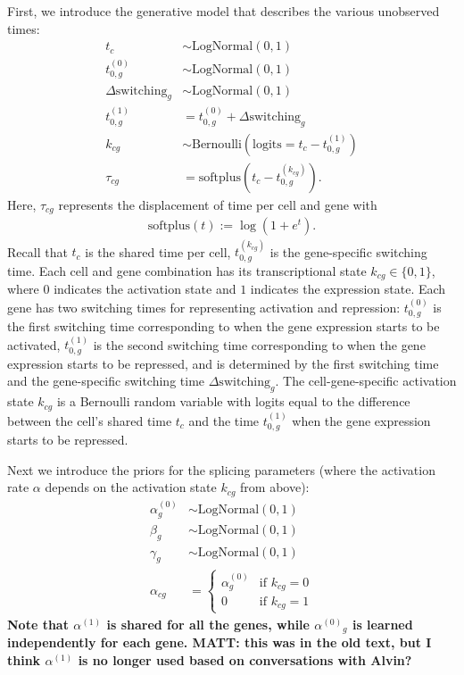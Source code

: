 \documentclass[
  sn-mathphys-num,
  lineno,
  twocolumn]{sn-jnl}
\begin{document}
First, we introduce the generative model that describes the various
unobserved times: \begin{align}
  t_c &\sim \text{LogNormal}(0, 1) \\
  t^{(0)}_{0,g} &\sim \text{LogNormal}(0, 1) \\
  \Delta \textrm{switching}_g &\sim \text{LogNormal}(0, 1) \\
  t^{(1)}_{0,g} &= t^{(0)}_{0,g} + \Delta \textrm{switching}_g \\
  k_{cg} &\sim \text{Bernoulli}(\textrm{logits}=t_c - t^{(1)}_{0,g}) \\
  \tau_{cg} &= \text{softplus}(t_c - t^{(k_{cg})}_{0,g}).
\end{align} Here, \(\tau_{cg}\) represents the displacement of time per
cell and gene with \begin{align}
 \text{softplus}(t) :=  \log( 1 + e^t).
\end{align} Recall that \(t_c\) is the shared time per cell,
\(t^{(k_{cg})}_{0,g}\) is the gene-specific switching time. Each cell
and gene combination has its transcriptional state
\(k_{cg} \in \{ 0, 1 \}\), where \(0\) indicates the activation state
and \(1\) indicates the expression state. Each gene has two switching
times for representing activation and repression: \(t^{(0)}_{0,g}\) is
the first switching time corresponding to when the gene expression
starts to be activated, \(t^{(1)}_{0,g}\) is the second switching time
corresponding to when the gene expression starts to be repressed, and is
determined by the first switching time and the gene-specific switching
time \(\Delta \text{switching}_g\). The cell-gene-specific activation
state \(k_{cg}\) is a Bernoulli random variable with logits equal to the
difference between the cell's shared time \(t_c\) and the time
\(t^{(1)}_{0,g}\) when the gene expression starts to be repressed.

Next we introduce the priors for the splicing parameters (where the
activation rate \(\alpha\) depends on the activation state \(k_{cg}\)
from above): \begin{align}
  \alpha^{(0)}_g &\sim \text{LogNormal}(0, 1) \\
  \beta_g &\sim \text{LogNormal}(0, 1) \\
  \gamma_g &\sim \text{LogNormal}(0, 1) \\
  \alpha_{cg} &= \begin{cases}
    \alpha^{(0)}_g & \text{if } k_{cg} = 0 \\
    0 & \text{if } k_{cg} = 1
  \end{cases}
\end{align}
\textbf{Note that $\alpha^{(1)}$ is shared for all the genes, while ${\alpha^{(0)}}_g$ is learned independently for
each gene. MATT: this was in the old text, but I think $\alpha^{(1)}$ is no longer used based on conversations with Alvin?}
\end{document}
